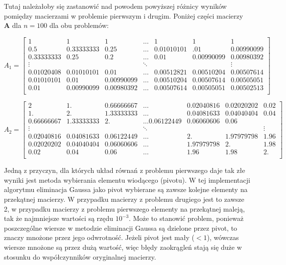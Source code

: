 \documentclass{article}
\begin{document}
Tutaj należałoby się zastanowić nad powodem powyższej różnicy wyników pomiędzy macierzami w problemie pierwszym i drugim.
Poniżej części macierzy \textbf{A} dla $n=100$ dla obu problemów:

$$
A_1 = 
\begin{bmatrix}
1 & 1 & 1  &  \hdots & 1 & 1 & 1\\
0.5   &     0.33333333 & 0.25   &  \hdots & 0.01010101 & .01 & 0.00990099\\
0.33333333 & 0.25    &   0.2     &   \hdots & 0.01   &    0.00990099& 0.00980392\\
\vdots & & & \ddots & & & \vdots\\
0.01020408 & 0.01010101 & 0.01  &     \hdots & 0.00512821 & 0.00510204  & 0.00507614\\
0.01010101 & 0.01  &     0.00990099 & \hdots & 0.00510204 & 0.00507614 & 0.00505051\\
0.01   &    0.00990099 & 0.00980392 & \hdots & 0.00507614 & 0.00505051 & 0.00502513\\
\end{bmatrix}
$$

$$
A_2 = 
\begin{bmatrix}
2  &       1.    &     0.66666667 & \hdots & 0.02040816 & 0.02020202 & 0.02\\ 
1.    &     2.     &    1.33333333 & \hdots & 0.04081633 & 0.04040404 & 0.04\\
0.66666667 & 1.33333333 & 2.    &     \hdots 0.06122449 & 0.06060606 & 0.06\\
\vdots & & & \ddots & & & \vdots\\
0.02040816 & 0.04081633 & 0.06122449 & \hdots & 2.     &    1.97979798 & 1.96\\
0.02020202 & 0.04040404 & 0.06060606 & \hdots & 1.97979798 & 2.         & 1.98\\
0.02     &  0.04    &   0.06    &  \hdots & 1.96    &   1.98   &    2.\\
\end{bmatrix}
$$

Jedną z przyczyn, dla których układ równań z problemu pierwszego daje tak złe wyniki jest metoda wybierania elementu wiodącego
(pivotu). W tej implementacji algorytmu eliminacja Gaussa jako pivot wybierane są zawsze kolejne elementy na przekątnej 
macierzy. W przypadku macierzy z problemu drugiego jest to zawsze 2, w przypadku macierzy z problemu pierwszego elementy
na przekątnej maleją, tak że najmniejsze wartości są rzędu $10^{-3}$. Może to stanowić problem, ponieważ poszczególne wiersze
w metodzie eliminacji Gaussa są dzielone przez pivot, to znaczy mnożone przez jego odwrotność. Jeżeli pivot jest mały ($<1$), wówczas
wiersze mnożone są przez dużą wartość, więc błędy zaokrągleń stają się duże w stosunku do współczynników oryginalnej macierzy.
\end{document}
